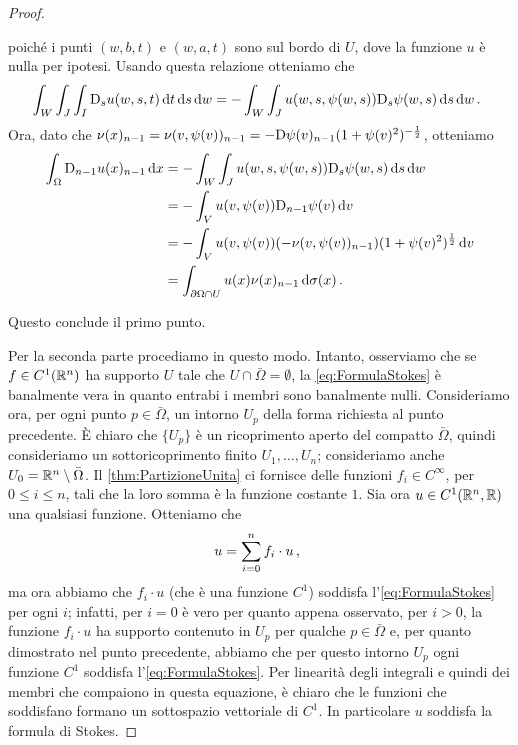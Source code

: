 \begin{proof}
\begin{description}
			poiché i punti $(w,b,t)$ e $(w,a,t)$ sono sul bordo di $U$, dove la funzione $u$ è nulla per ipotesi. Usando questa relazione
			otteniamo che
			\[
				\int_W\int_J\int_I\mathrm D_s u(w,s,t) \,\mathrm d t \,\mathrm d s \,\mathrm d w =-\int_W \int_J u(w,s,\psi(w,s))\mathrm D_s \psi (w,s)\,\mathrm d s\,\mathrm d w\, \text{. }
			\]
			Ora, dato che $\nu(x)_{n-1}=\nu(v,\psi(v))_{n-1}=-\mathrm D\psi(v)_{n-1}(1+\psi(v)^2)^{-\frac{1}{2}}$, otteniamo
			\begin{align*}
				\int_{\Omega} \mathrm D_{n-1} u(x)_{n-1} \,\mathrm d x & = -\int_W \int_J u(w,s,\psi(w,s))\mathrm D_s \psi (w,s) \,\mathrm d s \,\mathrm d w\\
				& = -\int_V u(v,\psi(v))\mathrm D_{n-1} \psi(v) \,\mathrm d v\\
				& = -\int_V u(v,\psi(v))(-\nu(v,\psi(v))_{n-1})(1+\psi(v)^2)^{\frac{1}{2}} \,\mathrm d v\\
				& = \int_{\partial \Omega \cap U} u(x)\nu(x)_{n-1} \,\mathrm d \sigma(x)\, \text{. }
			\end{align*}
	\end{description}
	Questo conclude il primo punto.
	
	Per la seconda parte procediamo in questo modo. Intanto, osserviamo che se $f\in C^1(\mathbb R^n)$ ha supporto $U$ tale che $U\cap \bar\Omega =
	\emptyset$, la \cref{eq:FormulaStokes} è banalmente vera in quanto entrabi i membri sono banalmente nulli.
	Consideriamo ora, per ogni punto $p\in \bar\Omega$, un intorno $U_p$ della forma richiesta al punto precedente. È chiaro che $\{U_p\}$ è un
	ricoprimento aperto del compatto $\bar \Omega$, quindi consideriamo un sottoricoprimento finito $U_1,\dots,U_n$; consideriamo anche
	$U_0=\mathbb R^n \setminus \bar\Omega$. Il \cref{thm:PartizioneUnita} ci fornisce delle funzioni $f_i\in C^{\infty}$, per $0\leq i \leq n$,
	tali che la loro somma è la funzione costante $1$.
	Sia ora $u\in C^1(\mathbb R^n,\mathbb R)$ una qualsiasi funzione. Otteniamo che
	\[
		u = \sum_{i=0}^n f_i\cdot u\, \text{, }
	\]
	ma ora abbiamo che $f_i \cdot u$ (che è una funzione $C^1$) soddisfa l'\cref{eq:FormulaStokes} per ogni $i$; infatti, per $i=0$ è vero
	per quanto appena osservato, per $i>0$, la funzione $f_i \cdot u$ ha supporto contenuto in $U_p$ per qualche $p\in \bar\Omega$ e, per quanto
	dimostrato nel punto precedente, abbiamo che per questo intorno $U_p$ ogni funzione $C^1$ soddisfa l'\cref{eq:FormulaStokes}.
	Per linearità degli integrali e quindi dei membri che compaiono in questa equazione, è chiaro che le funzioni che soddisfano formano
	un sottospazio vettoriale di $C^1$. In particolare $u$ soddisfa la formula di Stokes.
\end{proof}

